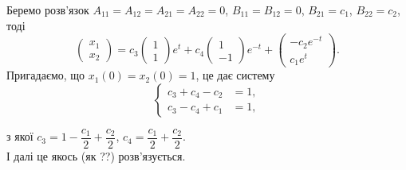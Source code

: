 \begin{solution}
    Беремо розв'язок $A_{11} = A_{12} = A_{21} = A_{22} = 0$, $B_{11} = B_{12} = 0$, $B_{21} = c_1$, $B_{22} = c_2$, тоді
    \begin{equation}
        \begin{pmatrix} x_1 \\ x_2 \end{pmatrix} = c_3 \begin{pmatrix} 1 \\ 1 \end{pmatrix} e^t + c_4 \begin{pmatrix} 1 \\ -1 \end{pmatrix} e^{-t} + \begin{pmatrix} - c_2 e^{-t} \\ c_1 e^t \end{pmatrix}.
    \end{equation}
    Пригадаємо, що $x_1(0) = x_2(0) = 1$, це дає систему
    \[ \left\{ \begin{aligned}
        c_3 + c_4 - c_2 &= 1, \\
        c_3 - c_4 + c_1 &= 1,
    \end{aligned} \right. \]

    з якої $c_3 = 1 - \dfrac{c_1}{2} + \dfrac{c_2}{2}$, $c_4 = \dfrac{c_1}{2} + \dfrac{c_2}{2}$. \\
    
    І далі це якось (як ??) розв'язується.
\end{solution}

\begin{problem}
\end{problem}

\begin{solution}
\end{solution}

\begin{problem}
\end{problem}

\begin{solution}
\end{solution}
